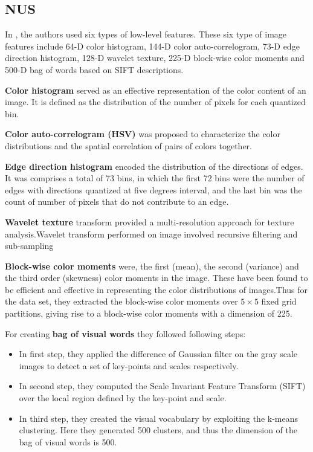 \subsection{NUS}

In \citet*{NUS}, the authors  used six types of low-level features. These six type of image features include 64-D color
histogram, 144-D color auto-correlogram, 73-D edge direction histogram, 128-D wavelet texture, 225-D block-wise color moments and 500-D bag of words based on SIFT descriptions.

\textbf{Color histogram} served as an effective representation of the color content of an image. It is defined as the distribution of the
number of pixels for each quantized bin.

\textbf{Color auto-correlogram (HSV)} was proposed to characterize the color distributions and the spatial correlation of pairs of colors
together.

\textbf{Edge direction histogram} encoded the distribution of the directions of edges. It was comprises a total of 73 bins, in which the first 72 bins were the number of edges with directions quantized at five degrees interval, and the last bin was the count of number of pixels that do not contribute to an edge.

\textbf{Wavelet texture} transform provided a multi-resolution approach for texture analysis.Wavelet transform performed on image involved recursive filtering and sub-sampling

\textbf{Block-wise color moments} were, the first (mean), the second (variance) and the third order (skewness)
color moments in the image. These have been found to be efficient and effective in representing the color distributions of images.Thus for the data set, they extracted the block-wise color moments over $5\times5$ fixed grid partitions, giving rise to a block-wise color moments with a dimension of 225.

For creating \textbf{bag of visual words} they followed following steps:
\begin{itemize}
\item In first step, they applied the difference of Gaussian filter on the gray scale images to detect a set of key-points and scales respectively.
\item In second step, they computed the Scale Invariant Feature Transform (SIFT) over the local region defined by the key-point and scale.
\item In third step, they created the visual vocabulary by exploiting the k-means clustering. Here they generated 500 clusters, and
thus the dimension of the bag of visual words is 500.
\end{itemize}

